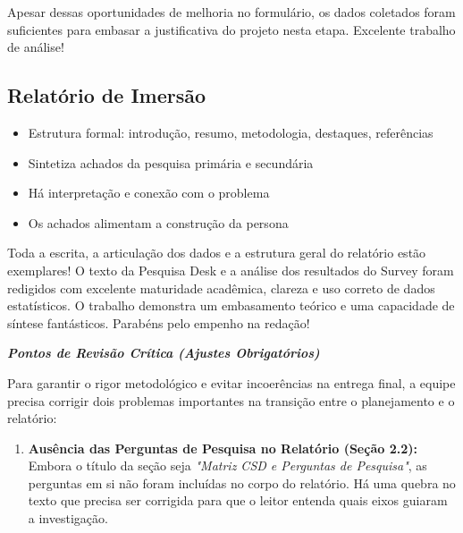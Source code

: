 \documentclass[
  sigconf,
  nonacm, %
  language=portuguese
]{acmart}
\newcommand{\statusok}[1]{{\small\bfseries\color{cgood}#1}}
\begin{document}
Apesar dessas oportunidades de melhoria no formulário, os dados coletados foram suficientes para embasar a justificativa do projeto nesta etapa. Excelente trabalho de análise!

\subsection{Relatório de Imersão}

\noindent\statusok{1,00\,/\,1,00 pts · Completo}

\begin{itemize}[leftmargin=14pt,itemsep=1pt,topsep=3pt,parsep=0pt]
  \item[\textcolor{cgood}{$\checkmark$}] {\small\textcolor{cgood}{Estrutura formal: introdução, resumo, metodologia, destaques, referências}}
  \item[\textcolor{cgood}{$\checkmark$}] {\small\textcolor{cgood}{Sintetiza achados da pesquisa primária e secundária}}
  \item[\textcolor{cgood}{$\checkmark$}] {\small\textcolor{cgood}{Há interpretação e conexão com o problema}}
  \item[\textcolor{cgood}{$\checkmark$}] {\small\textcolor{cgood}{Os achados alimentam a construção da persona}}
\end{itemize}

Toda a escrita, a articulação dos dados e a estrutura geral do relatório estão exemplares! O texto da Pesquisa Desk e a análise dos resultados do Survey foram redigidos com excelente maturidade acadêmica, clareza e uso correto de dados estatísticos. O trabalho demonstra um embasamento teórico e uma capacidade de síntese fantásticos. Parabéns pelo empenho na redação!

\textit{\textbf{\textbf{Pontos de Revisão Crítica (Ajustes Obrigatórios)}}}

Para garantir o rigor metodológico e evitar incoerências na entrega final, a equipe precisa corrigir dois problemas importantes na transição entre o planejamento e o relatório:

\begin{enumerate}[leftmargin=14pt,itemsep=2pt,topsep=4pt]
  \item \textbf{Ausência das Perguntas de Pesquisa no Relatório (Seção 2.2):} Embora o título da seção seja \textit{"Matriz CSD e Perguntas de Pesquisa"}, as perguntas em si não foram incluídas no corpo do relatório. Há uma quebra no texto que precisa ser corrigida para que o leitor entenda quais eixos guiaram a investigação.
\end{enumerate}
\end{document}
